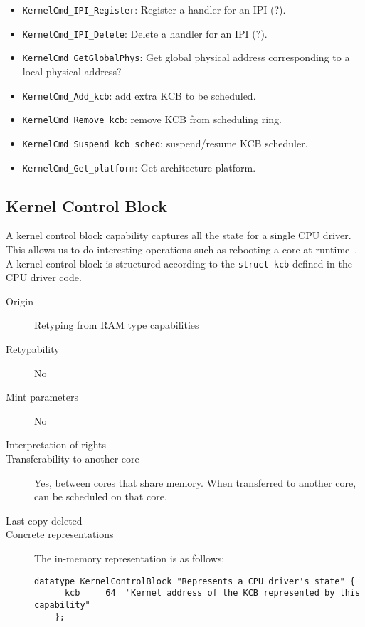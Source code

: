 \begin{itemize}
  \item \verb|KernelCmd_IPI_Register|: Register a handler for an IPI (?).
  \item \verb|KernelCmd_IPI_Delete|: Delete a handler for an IPI (?).
  \item \verb|KernelCmd_GetGlobalPhys|: Get global physical address
    corresponding to a local physical address?
  \item \verb|KernelCmd_Add_kcb|: add extra KCB to be scheduled.
  \item \verb|KernelCmd_Remove_kcb|: remove KCB from scheduling ring.
  \item \verb|KernelCmd_Suspend_kcb_sched|: suspend/resume KCB scheduler.
  \item \verb|KernelCmd_Get_platform|: Get architecture platform.
\end{itemize}

\subsection{Kernel Control Block}
A kernel control block capability captures all the state for a single CPU
driver.  This allows us to do interesting operations such as rebooting a core
at runtime~\cite{Coreboot:Zellweger2014}.
A kernel control block is structured according to the \verb|struct kcb|
defined in the CPU driver code.

\begin{description}
\item[Origin] Retyping from RAM type capabilities

\item[Retypability] No

\item[Mint parameters] No

\item[Interpretation of rights] 

\item[Transferability to another core] Yes, between cores that share memory.
  When transferred to another core, can be scheduled on that core.

\item[Last copy deleted] 

\item[Concrete representations] The in-memory representation is as follows:
    
  \begin{lstlisting}[language=Mackerel]
    datatype KernelControlBlock "Represents a CPU driver's state" {
      kcb     64  "Kernel address of the KCB represented by this capability"
    };
    \end{lstlisting}
\end{description}

